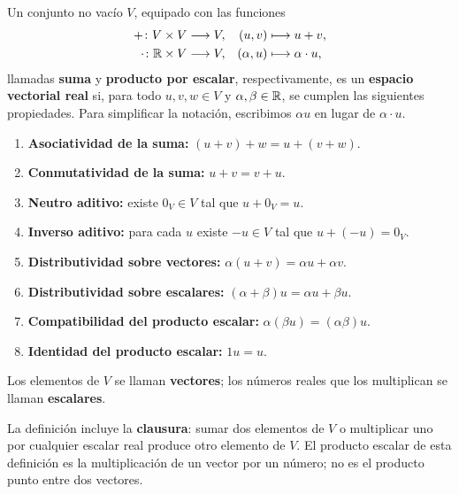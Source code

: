 \documentclass[compacto,10pt]{pubciencias-notas}
\renewenvironment{defi}[1][]
    {\begin{recuadrocti}[nombre=#1,tipo=Definición,contador=defi,
        color=colordef,nobreak=false,needspace=0pt,
        splittopskip=\topskip,splitbottomskip=0pt]}
    {\end{recuadrocti}}
\begin{document}
\begin{defi}[Espacio vectorial real]\label{sem05cl02:espacio}
    Un conjunto no vacío $V$, equipado con las funciones
    \[
        \begin{aligned}
            +\colon V\times V&\longrightarrow V,
            & (u,v)&\longmapsto u+v,\\
            \cdot\colon\mathbb{R}\times V&\longrightarrow V,
            & (\alpha,u)&\longmapsto\alpha\cdot u,
        \end{aligned}
    \]
    llamadas \textbf{suma} y \textbf{producto por escalar}, respectivamente,
    es un \textbf{espacio vectorial real} si, para todo $u,v,w\in V$ y
    $\alpha,\beta\in\mathbb{R}$, se cumplen las siguientes propiedades.
    Para simplificar la notación, escribimos $\alpha u$ en lugar de
    $\alpha\cdot u$.
    \begin{enumerate}
        \item \textbf{Asociatividad de la suma:} $(u+v)+w=u+(v+w)$.
        \item \textbf{Conmutatividad de la suma:} $u+v=v+u$.
        \item \textbf{Neutro aditivo:} existe $0_V\in V$ tal que $u+0_V=u$.
        \item \textbf{Inverso aditivo:} para cada $u$ existe $-u\in V$
              tal que $u+(-u)=0_V$.
        \item \textbf{Distributividad sobre vectores:}
              $\alpha(u+v)=\alpha u+\alpha v$.
        \item \textbf{Distributividad sobre escalares:}
              $(\alpha+\beta)u=\alpha u+\beta u$.
        \item \textbf{Compatibilidad del producto escalar:}
              $\alpha(\beta u)=(\alpha\beta)u$.
        \item \textbf{Identidad del producto escalar:} $1u=u$.
    \end{enumerate}
    Los elementos de $V$ se llaman \textbf{vectores}; los números reales
    que los multiplican se llaman \textbf{escalares}.
\end{defi}

\begin{obs}
    La definición incluye la \textbf{clausura}: sumar dos elementos de $V$
    o multiplicar uno por cualquier escalar real produce otro elemento de $V$.
    El producto escalar de esta definición es la multiplicación de un vector
    por un número; no es el producto punto entre dos vectores.
\end{obs}
\end{document}
